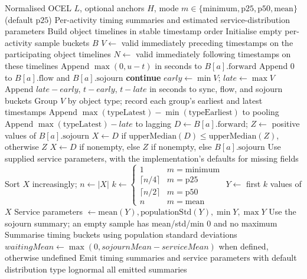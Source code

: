 \begin{algorithm}[tbp]
\caption{Activity timing and service-time estimation}
\label{alg:activity-timing-and-service-time-estimation}
\small
\begin{algorithmic}[1]
\Require Normalised OCEL $L$, optional anchors $H$, mode $m\in\{\mathrm{minimum},\mathrm{p25},\mathrm{p50},\mathrm{mean}\}$ (default $\mathrm{p25}$)
\Ensure Per-activity timing summaries and estimated service-distribution parameters
\State Build object timelines in stable timestamp order
\State Initialise empty per-activity sample buckets $B$
    \State $V \gets$ valid immediately preceding timestamps on the participating object timelines
    \State $N \gets$ valid immediately following timestamps on these timelines
     \State Append $\max(0,u-t)$ in seconds to $B[a].\mathrm{forward}$ \EndFor
        \State Append $0$ to $B[a].\mathrm{flow}$ and $B[a].\mathrm{sojourn}$
        \State \textbf{continue}
    \EndIf
    \State $early\gets\min V$; $late\gets\max V$
    \State Append $late-early$, $t-early$, $t-late$ in seconds to sync, flow, and sojourn buckets
    \State Group $V$ by object type; record each group's earliest and latest timestamps
    \State Append $\max(\mathrm{typeLatest})-\min(\mathrm{typeEarliest})$ to pooling
    \State Append $\max(\mathrm{typeLatest})-late$ to lagging 
\EndFor
{}
    \State $D\gets B[a].\mathrm{forward}$; $Z\gets$ positive values of $B[a].\mathrm{sojourn}$
        \State $X\gets D$ if $\mathrm{upperMedian}(D)\le\mathrm{upperMedian}(Z)$, otherwise $Z$
    \Else
        \State $X\gets D$ if nonempty, else $Z$ if nonempty, else $B[a].\mathrm{sojourn}$
    \EndIf
        \State Use supplied service parameters, with the implementation's defaults for missing fields
        \State Sort $X$ increasingly; $n\gets |X|$
        \State $k\gets\begin{cases}1 & m=\mathrm{minimum}\\ \lceil n/4\rceil & m=\mathrm{p25}\\ \lceil n/2\rceil & m=\mathrm{p50}\\ n & m=\mathrm{mean}\end{cases}$
        \State $Y\gets$ first $k$ values of $X$
        \State Service parameters $\gets \mathrm{mean}(Y),\mathrm{populationStd}(Y),\min Y,\max Y$
    \Else
        \State Use the sojourn summary; an empty sample has mean/std/min $0$ and no maximum
    \EndIf
    \State Summarise timing buckets using population standard deviations
    \State $waitingMean\gets\max(0,sojournMean-serviceMean)$ when defined, otherwise undefined
    \State Emit timing summaries and service parameters with default distribution type lognormal
\EndFor
\State \Return all emitted summaries
\end{algorithmic}
\end{algorithm}
